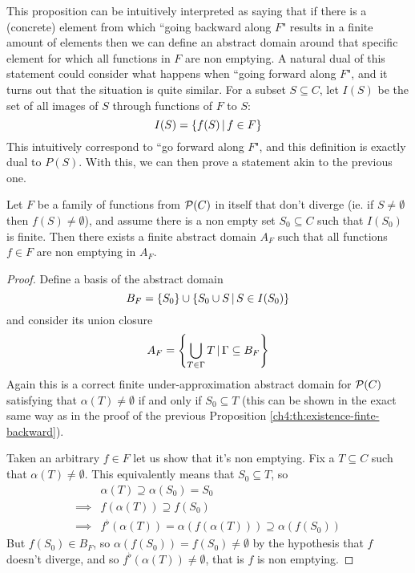 This proposition can be intuitively interpreted as saying that if there is a (concrete) element from which ``going backward along $F$" results in a finite amount of elements then we can define an abstract domain around that specific element for which all functions in $F$ are non emptying.
A natural dual of this statement could consider what happens when ``going forward along $F$", and it turns out that the situation is quite similar.
For a subset $S \subseteq C$, let $I(S)$ be the set of all images of $S$ through functions of $F$ to $S$:
\[
I(S) = \{ f(S) \,\vert\, f \in F \}
\]
This intuitively correspond to ``go forward along $F$", and this definition is exactly dual to $P(S)$. With this, we can then prove a statement akin to the previous one.
\begin{prop}\label{ch4:th:existence-finte-forward}
	Let $F$ be a family of functions from $\mathcal{P}(C)$ in itself that don't diverge (ie. if $S \neq \emptyset$ then $f(S) \neq \emptyset$), and assume there is a non empty set $S_0 \subseteq C$ such that $I(S_0)$ is finite. Then there exists a finite abstract domain $A_F$ such that all functions $f \in F$ are non emptying in $A_F$.
\end{prop}
\begin{proof}
	Define a basis of the abstract domain
	\[
	B_F = \{ S_0 \} \cup \{ S_0 \cup S \,\vert\, S \in I(S_0) \}
	\]
	and consider its union closure
	\[
	A_F = \left\lbrace \bigcup\limits_{T \in \Gamma} T \,\vert\, \Gamma \subseteq B_F \right\rbrace
	\]
	Again this is a correct finite under-approximation abstract domain for $\mathcal{P}(C)$ satisfying that $\alpha(T) \neq \emptyset$ if and only if $S_0 \subseteq T$ (this can be shown in the exact same way as in the proof of the previous Proposition \ref{ch4:th:existence-finte-backward}).

	Taken an arbitrary $f \in F$ let us show that it's non emptying. Fix a $T \subseteq C$ such that $\alpha(T) \neq \emptyset$. This equivalently means that $S_0 \subseteq T$, so
	\begin{align*}
		& \alpha(T) \supseteq \alpha(S_0) = S_0 \\
		\implies& f(\alpha(T)) \supseteq f(S_0) \\
		\implies& f^{\flat}(\alpha(T)) = \alpha(f(\alpha(T))) \supseteq \alpha(f(S_0))
	\end{align*}
	But $f(S_0) \in B_F$, so $\alpha(f(S_0)) = f(S_0) \neq \emptyset$ by the hypothesis that $f$ doesn't diverge, and so $f^{\flat}(\alpha(T)) \neq \emptyset$, that is $f$ is non emptying.
\end{proof}
